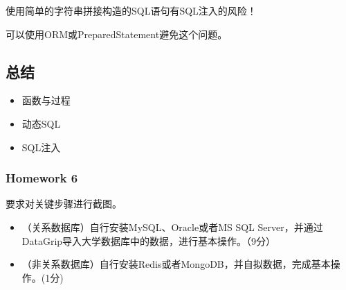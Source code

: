 \documentclass[aspectratio=169, 14pt]{beamer}
\begin{document}
{
\begin{frame}[standout]
使用简单的字符串拼接构造的SQL语句有SQL注入的风险！

可以使用ORM或PreparedStatement避免这个问题。
\end{frame}
}


\begin{frame}[fragile]
    \section{\textcolor{darkmidnightblue}{总结}}

\begin{itemize}
    \item 函数与过程
    \item 动态SQL
    \item SQL注入
\end{itemize}
\end{frame}

\begin{frame}
    \frametitle{Homework 6}
要求对关键步骤进行截图。
    \begin{itemize}
        \item （关系数据库）自行安装MySQL、Oracle或者MS SQL Server，并通过DataGrip导入大学数据库中的数据，进行基本操作。（9分）
        \item （非关系数据库）自行安装Redis或者MongoDB，并自拟数据，完成基本操作。(1分)
    \end{itemize}

\end{frame}
\end{document}
